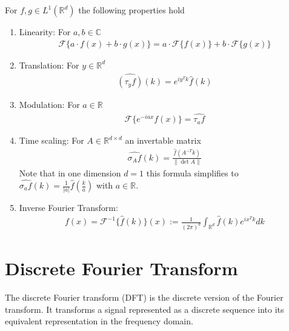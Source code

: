 \begin{proposition}
    For $f, g \in L^1(\mathbb{R}^d)$ the following properties hold

    \begin{enumerate}

        \item Linearity: For $a, b \in \mathbb{C}$
        \begin{align*}
            \mathscr{F} \{ a \cdot f(x) + b \cdot g(x) \} = a \cdot \mathscr{F} \{f(x)\} + b \cdot \mathscr{F} \{ g(x) \}
        \end{align*}

        \item Translation: For $y \in \mathbb{R}^d$
        \begin{align*}
            \widehat{(\tau_y f)}(k) = e^{i y^T k} \widehat{f}(k)
        \end{align*}

        \item Modulation: For $a \in \mathbb{R}$
        \begin{align*}
            \mathscr{F} \{e^{-i a x} f(x) \} = \widehat{\tau_a f}
        \end{align*}

        \item Time scaling: For $A \in \mathbb{R}^{d \times d}$ an invertable matrix
        \begin{align*}
            \widehat{\sigma_A f}(k) = \frac{\widehat{f}(A^{-T} k)}{\| \det A \|}
        \end{align*}
        Note that in one dimension $d = 1$ this formula simplifies to $\widehat{\sigma_a f}(k) = \frac{1}{|a|} \widehat{f}(\frac{k}{a})$ with $a \in \mathbb{R}$.

        \item Inverse Fourier Transform: 
        \begin{align*}
            f(x) = \mathscr{F}^{-1} \{ \widehat{f}(k) \}(x) := \frac{1}{(2\pi)^d} \int_{\mathbb{R}^d} \widehat{f}(k) e^{i x^T k} dk 
        \end{align*}
    \end{enumerate}
    \label{prop:fourier_properties}
\end{proposition}

\section{Discrete Fourier Transform}
The discrete Fourier transform (DFT) is the discrete version of the Fourier transform. It transforms a signal represented as a discrete sequence into its equivalent 
representation in the frequency domain.

